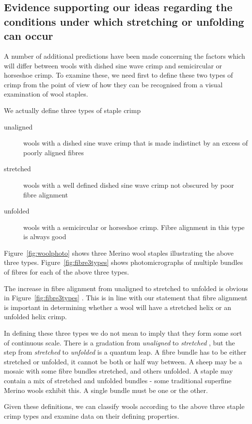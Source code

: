 \documentclass[titlepage,10pt]{article}  %
\begin{document}
\subsection{Evidence supporting our ideas regarding the conditions under which stretching or unfolding can occur}
\label{sec:evid2}

A number of additional predictions have been made concerning the factors which will differ between wools with dished sine wave crimp and semicircular or horseshoe crimp. To examine these, we need first to define these two types of crimp from the point of view of how they can be recognised from a visual examination of wool staples.

We actually define three types of staple crimp

\begin{description}
\item[unaligned] wools with a dished sine wave crimp that is made indistinct by an excess of poorly aligned fibres
\item[stretched] wools with a well defined dished sine wave crimp not obscured by poor fibre alignment
\item[unfolded] wools with a semicircular or horseshoe crimp. Fibre alignment in this type is always good
\end{description}

Figure~\ref{fig:woolphoto} shows three Merino wool staples illustrating the above three types. Figure~\ref{fig:fibre3types} shows photomicrographs of multiple bundles of fibres for each of the above three types.


The increase in fibre alignment from unaligned to stretched to unfolded is obvious in  Figure~\ref{fig:fibre3types} . This is in line with our statement that fibre alignment is important in determining whether a wool will have a stretched helix or an unfolded helix crimp.

In defining these three types we do not mean to imply that they form some sort of continuous scale. There is a gradation from {\em unaligned} to {\em stretched} , but the step from {\em stretched} to {\em unfolded} is a quantum leap. A fibre bundle has to be either stretched or unfolded, it cannot be both or half way between. A sheep may be a mosaic with some fibre bundles stretched, and others unfolded. A staple may contain a mix of stretched and unfolded bundles - some traditional superfine Merino wools exhibit this. A single bundle must be one or the other.

Given these definitions, we can classify wools according to the above three staple crimp types and examine data on their defining properties.
\end{document}
